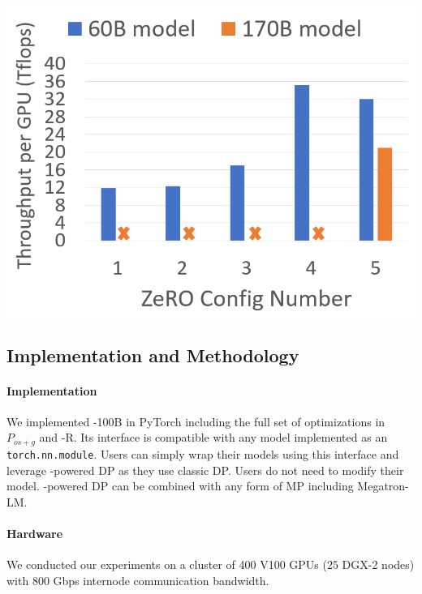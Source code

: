 \begin{table}
\begin{minipage}[b]{0.30\columnwidth}
       \includegraphics[width=\textwidth]{tput_vs_config.PNG}
         \label{fig:max-performance}
   \end{minipage}
   \end{table}
  
\subsection{Implementation and Methodology}


\paragraph{Implementation}
We implemented \name-100B in PyTorch including the full set of optimizations in $P_{os+g}$ and \name-R.  Its interface is compatible with any model implemented as an {\tt torch.nn.module}. Users can simply wrap their models using this interface and leverage \name-powered DP as they use classic DP. Users do not need to modify their model.  \name-powered DP can be combined with any form of MP including Megatron-LM.

\paragraph{Hardware}
We conducted our experiments on a cluster of 400 V100 GPUs ($25$ DGX-2 nodes) with 800 Gbps internode communication bandwidth.


